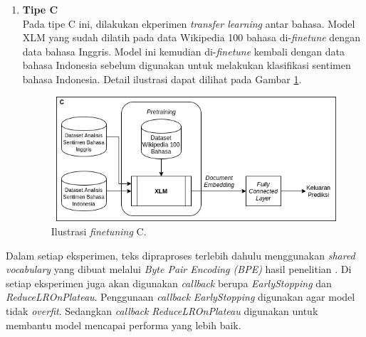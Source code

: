 \begin{enumerate}
		\item \textbf{Tipe C}\\
		Pada tipe C ini, dilakukan ekperimen \textit{transfer learning} antar bahasa. Model XLM yang sudah dilatih pada data Wikipedia 100 bahasa di-\textit{finetune} dengan data bahasa Inggris. Model ini kemudian di-\textit{finetune} kembali dengan data bahasa Indonesia sebelum digunakan untuk melakukan klasifikasi sentimen bahasa Indonesia. Detail ilustrasi dapat dilihat pada Gambar \ref{fig:ilustrasi_solusi_3}.

		\begin{figure}[h]
		    \centering
		    \includegraphics[width=1\textwidth]{resources/Arsitektur-TA-3.png}
		    \caption{ Ilustrasi \textit{finetuning} C.}
		    \label{fig:ilustrasi_solusi_3}
		\end{figure}
		
	\end{enumerate}

	Dalam setiap eksperimen, teks dipraproses terlebih dahulu menggunakan \textit{shared vocabulary} yang dibuat melalui \textit{Byte Pair Encoding (BPE)} hasil penelitian \parencite{LampleConneau2019}. Di setiap eksperimen juga akan digunakan \textit{callback} berupa \textit{EarlyStopping} dan \textit{ReduceLROnPlateau}. Penggunaan \textit{callback} \textit{EarlyStopping} digunakan agar model tidak \textit{overfit}. Sedangkan \textit{callback} \textit{ReduceLROnPlateau} digunakan untuk membantu model mencapai performa yang lebih baik.
